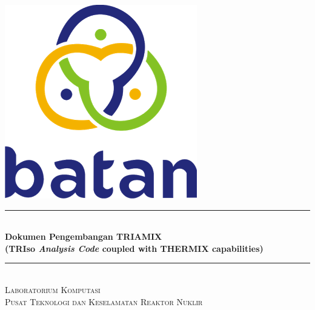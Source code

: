 \begin{titlepage}

\newcommand{\HRule}{\rule{\linewidth}{0.5mm}} %

\center %



\includegraphics[scale=.25]{pics/logo.png}\\[1cm] %


\HRule \\[0.4cm]
{ \huge \bfseries Dokumen Pengembangan TRIAMIX \\ (TRIso \textit{Analysis Code} coupled with THERMIX capabilities)}\\[0.4cm] %
\HRule \\[1.5cm]

\textsc{Laboratorium Komputasi}\\[0.25cm] %
\textsc{\Large Pusat Teknologi dan Keselamatan Reaktor Nuklir}\\[1.5cm] %


\end{titlepage}
